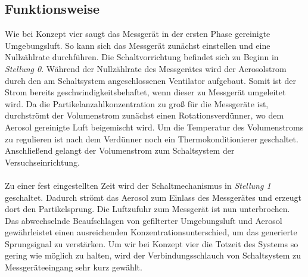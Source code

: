 \subsection{Funktionsweise}
Wie bei Konzept vier saugt das Messger\"{a}t in der ersten Phase gereinigte Umgebungsluft. So kann sich das Messger\"{a}t zun\"{a}chst einstellen und eine Nullz\"{a}hlrate durchf\"{u}hren. Die Schaltvorrichtung befindet sich zu Beginn in \textit{Stellung 0}. W\"{a}hrend der Nullz\"{a}hlrate des Messger\"{a}tes wird der Aerosolstrom durch den am Schaltsystem angeschlossenen Ventilator aufgebaut. Somit ist der Strom bereits geschwindigkeitsbehaftet, wenn dieser zu Messger\"{a}t umgeleitet wird. Da die Partikelanzahlkonzentration zu gro{\ss} f\"{u}r die Messger\"{a}te ist, durchstr\"{o}mt der Volumenstrom zun\"{a}chst einen Rotationsverd\"{u}nner, wo dem Aerosol gereinigte Luft beigemischt wird. Um die Temperatur des Volumenstroms zu regulieren ist nach dem Verd\"{u}nner noch ein Thermokonditionierer geschaltet. Anschlie{\ss}end gelangt der Volumenstrom zum Schaltsystem der Versuchseinrichtung.
\\\\
Zu einer fest eingestellten Zeit wird der Schaltmechanismus in \textit{Stellung 1} geschaltet. Dadurch str\"{o}mt das Aerosol zum Einlass des Messger\"{a}tes und erzeugt dort den Partikelsprung. Die Luftzufuhr zum Messger\"{a}t ist nun unterbrochen. Das abwechselnde Beaufschlagen von gefilterter Umgebungsluft und Aerosol gew\"{a}hrleistet einen ausreichenden Konzentrationsunterschied, um das generierte Sprungsignal zu verst\"{a}rken\cite{auswertemethodik}. Um wir bei Konzept vier die Totzeit des Systems so gering wie m\"{o}glich zu halten, wird der Verbindungsschlauch von Schaltsystem zu Messger\"{a}teeingang sehr kurz gew\"{a}hlt.